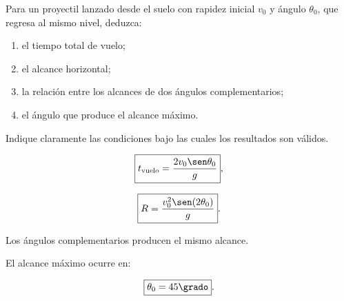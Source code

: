 \begin{ejercicio}
Para un proyectil lanzado desde el suelo con rapidez inicial \(v_0\) y ángulo
\(\theta_0\), que regresa al mismo nivel, deduzca:

\begin{enumerate}[label=\alph*)]
    \item el tiempo total de vuelo;
    \item el alcance horizontal;
    \item la relación entre los alcances de dos ángulos complementarios;
    \item el ángulo que produce el alcance máximo.
\end{enumerate}

Indique claramente las condiciones bajo las cuales los resultados son válidos.
\end{ejercicio}

\begin{respuesta}
\[
\boxed{
t_{\mathrm{vuelo}}
=
\frac{
2v_0\sen\theta_0
}{
g
}
},
\]

\[
\boxed{
R
=
\frac{
v_0^2\sen(2\theta_0)
}{
g
}
}.
\]

Los ángulos complementarios producen el mismo alcance.

El alcance máximo ocurre en:

\[
\boxed{
\theta_0=45\grado
}.
\]
\end{respuesta}

